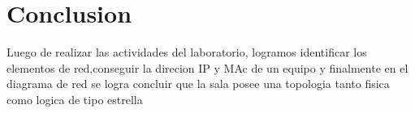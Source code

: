\documentclass{article}
\begin{document}
\section{Conclusion}
Luego de realizar las actividades del laboratorio, logramos identificar los elementos de red,conseguir la direcion IP y MAc de un equipo y finalmente en el diagrama de red se logra concluir que la sala posee una topologia tanto fisica como logica de tipo estrella
\end{document}
